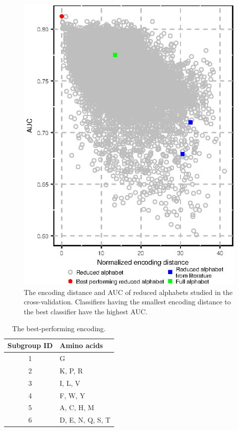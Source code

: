\documentclass{bioinfo}
\begin{document}
\begin{figure}[!tpb]
\centerline{\includegraphics{figures/ed_AUC.eps}}
\caption{The encoding distance and AUC of reduced alphabets studied in the 
cross-validation. 
Classifiers having the smallest encoding distance to the best classifier have 
the highest AUC.}\label{fig:ed_AUC}
\end{figure}

\begin{table}[ht]
\centering
\caption{The best-performing encoding.} 
\label{tab:best_enc}
\begin{tabular}{cl}
\toprule
Subgroup ID & Amino acids \\ 
\midrule
  1 & G \\ 
\rowcolor[gray]{0.85}  2 & K, P, R \\ 
3 & I, L, V \\ 
\rowcolor[gray]{0.85}  4 & F, W, Y \\ 
5 & A, C, H, M \\ 
\rowcolor[gray]{0.85}  6 & D, E, N, Q, S, T \\ 
\bottomrule
\end{tabular}
\end{table}
\end{document}
